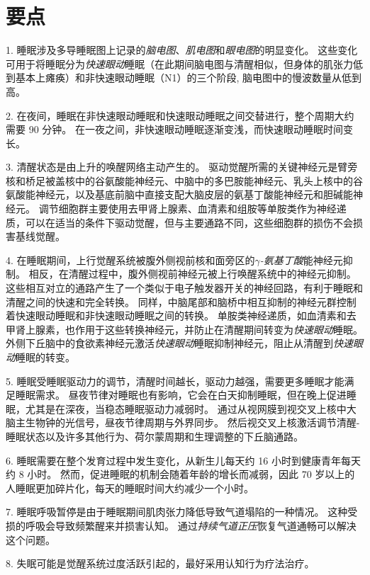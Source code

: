 \section{要点}

1. 睡眠涉及多导睡眠图上记录的\textit{脑电图}、\textit{肌电图}和\textit{眼电图}的明显变化。
这些变化可用于将睡眠分为\textit{快速眼动}睡眠（在此期间脑电图与清醒相似，但身体的肌张力低到基本上瘫痪）和非快速眼动睡眠（N1）的三个阶段, 脑电图中的慢波数量从低到高。 


2. 在夜间，睡眠在非快速眼动睡眠和快速眼动睡眠之间交替进行，整个周期大约需要 90 分钟。
在一夜之间，非快速眼动睡眠逐渐变浅，而快速眼动睡眠时间变长。


3. 清醒状态是由上升的唤醒网络主动产生的。
驱动觉醒所需的关键神经元是臂旁核和桥足被盖核中的谷氨酸能神经元、中脑中的多巴胺能神经元、乳头上核中的谷氨酸能神经元，以及基底前脑中直接支配大脑皮层的氨基丁酸能神经元和胆碱能神经元。
调节细胞群主要使用去甲肾上腺素、血清素和组胺等单胺类作为神经递质，可以在适当的条件下驱动觉醒，但与主要通路不同，这些细胞群的损伤不会损害基线觉醒。 


4. 在睡眠期间，上行觉醒系统被腹外侧视前核和面旁区的\textit{$\gamma$-氨基丁酸}能神经元抑制。
相反，在清醒过程中，腹外侧视前神经元被上行唤醒系统中的神经元抑制。
这些相互对立的通路产生了一个类似于电子触发器开关的神经回路，有利于睡眠和清醒之间的快速和完全转换。
同样，中脑尾部和脑桥中相互抑制的神经元群控制着快速眼动睡眠和非快速眼动睡眠之间的转换。
单胺类神经递质，如血清素和去甲肾上腺素，也作用于这些转换神经元，并防止在清醒期间转变为\textit{快速眼动}睡眠。
外侧下丘脑中的食欲素神经元激活\textit{快速眼动}睡眠抑制神经元，阻止从清醒到\textit{快速眼动}睡眠的转变。


5. 睡眠受睡眠驱动力的调节，清醒时间越长，驱动力越强，需要更多睡眠才能满足睡眠需求。
昼夜节律对睡眠也有影响，它会在白天抑制睡眠，但在晚上促进睡眠，尤其是在深夜，当稳态睡眠驱动力减弱时。
通过从视网膜到视交叉上核中大脑主生物钟的光信号，昼夜节律周期与外界同步。
然后视交叉上核激活调节清醒-睡眠状态以及许多其他行为、荷尔蒙周期和生理调整的下丘脑通路。


6. 睡眠需要在整个发育过程中发生变化，从新生儿每天约 16 小时到健康青年每天约 8 小时。
然而，促进睡眠的机制会随着年龄的增长而减弱，因此 70 岁以上的人睡眠更加碎片化，每天的睡眠时间大约减少一个小时。


7. 睡眠呼吸暂停是由于睡眠期间肌肉张力降低导致气道塌陷的一种情况。
这种受损的呼吸会导致频繁醒来并损害认知。
通过\textit{持续气道正压}恢复气道通畅可以解决这个问题。


8. 失眠可能是觉醒系统过度活跃引起的，最好采用认知行为疗法治疗。


